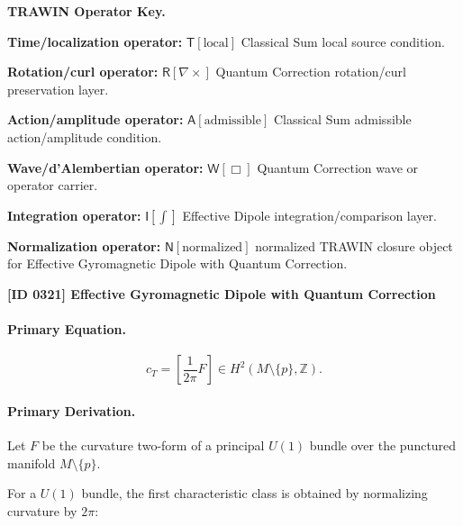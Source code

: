 \par\vspace{0.45\baselineskip}
\noindent\begin{minipage}[t]{\linewidth}
\begingroup
\small
\raggedright
\textbf{TRAWIN Operator Key.}\par
\noindent\textbf{Time/localization operator:} $\mathsf{T}\!\left[\mathrm{local}\right]$ Classical Sum local source condition.\par
\noindent\textbf{Rotation/curl operator:} $\mathsf{R}\!\left[\nabla\times\right]$ Quantum Correction rotation/curl preservation layer.\par
\noindent\textbf{Action/amplitude operator:} $\mathsf{A}\!\left[\mathrm{admissible}\right]$ Classical Sum admissible action/amplitude condition.\par
\noindent\textbf{Wave/d'Alembertian operator:} $\mathsf{W}\!\left[\Box\right]$ Quantum Correction wave or operator carrier.\par
\noindent\textbf{Integration operator:} $\mathsf{I}\!\left[\int\right]$ Effective Dipole integration/comparison layer.\par
\noindent\textbf{Normalization operator:} $\mathsf{N}\!\left[\mathrm{normalized}\right]$ normalized TRAWIN closure object for Effective Gyromagnetic Dipole with Quantum Correction.\par
\endgroup
\end{minipage}

\clearpage
\noindent\textbf{[ID 0321] Effective Gyromagnetic Dipole with Quantum Correction}\par
\vspace{0.35em}
\paragraph{Primary Equation.}
\begin{equation}
c_T
=
\left[
\frac{1}{2\pi}F
\right]
\in
H^2(M\setminus\{p\},\mathbb{Z}) .
\end{equation}

\paragraph{Primary Derivation.}
Let $F$ be the curvature two-form of a principal $U(1)$ bundle over the punctured manifold $M\setminus\{p\}$.

For a $U(1)$ bundle, the first characteristic class is obtained by normalizing curvature by $2\pi$:

